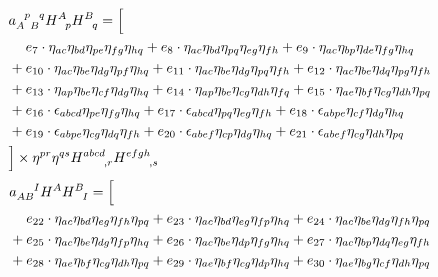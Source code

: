 \begin{itemize}
{\begin{minipage}[t]{\linewidth}
\begin{equation}
\begin{aligned}
    & a_{A\hphantom{p}B}^{\hphantom Ap\hphantom Bq} H^A_{\hphantom Ap} H^B_{\hphantom Bq} = \Big\lbrack \\
    & \hphantom{{}+{}} e_{7} \cdot \eta_{a c} \eta_{b d} \eta_{p e} \eta_{f g} \eta_{h q} + e_{8} \cdot \eta_{a c} \eta_{b d} \eta_{p q} \eta_{e g} \eta_{f h} + e_{9} \cdot \eta_{a c} \eta_{b p} \eta_{d e} \eta_{f g} \eta_{h q} \\
    & + e_{10} \cdot \eta_{a c} \eta_{b e} \eta_{d g} \eta_{p f} \eta_{h q} + e_{11} \cdot \eta_{a c} \eta_{b e} \eta_{d g} \eta_{p q} \eta_{f h} + e_{12} \cdot \eta_{a c} \eta_{b e} \eta_{d q} \eta_{p g} \eta_{f h} \\
    & + e_{13} \cdot \eta_{a p} \eta_{b e} \eta_{c f} \eta_{d g} \eta_{h q} + e_{14} \cdot \eta_{a p} \eta_{b e} \eta_{c g} \eta_{d h} \eta_{f q} + e_{15} \cdot \eta_{a e} \eta_{b f} \eta_{c g} \eta_{d h} \eta_{p q} \\
    & + e_{16} \cdot \epsilon_{a b c d} \eta_{p e} \eta_{f g} \eta_{h q} + e_{17} \cdot \epsilon_{a b c d} \eta_{p q} \eta_{e g} \eta_{f h} + e_{18} \cdot \epsilon_{a b p e} \eta_{c f} \eta_{d g} \eta_{h q} \\
    & + e_{19} \cdot \epsilon_{a b p e} \eta_{c g} \eta_{d q} \eta_{f h} + e_{20} \cdot \epsilon_{a b e f} \eta_{c p} \eta_{d g} \eta_{h q} + e_{21} \cdot \epsilon_{a b e f} \eta_{c g} \eta_{d h} \eta_{p q} \\
    & \Big\rbrack \times \eta^{pr} \eta^{qs} H^{abcd}_{\hphantom{abcd},r} H^{efgh}_{\hphantom{efgh},s}
  \end{aligned}
\end{equation}
\begin{equation}\label{ansatz_ABI}
  \begin{aligned}
    & a_{AB}^{\hphantom{AB}I} H^A H^B_{\hphantom BI} = \Big\lbrack \\
    & \hphantom{{}+{}} e_{22} \cdot \eta_{a c} \eta_{b d} \eta_{e g} \eta_{f h} \eta_{p q} + e_{23} \cdot \eta_{a c} \eta_{b d} \eta_{e g} \eta_{f p} \eta_{h q} + e_{24} \cdot \eta_{a c} \eta_{b e} \eta_{d g} \eta_{f h} \eta_{p q} \\
    & + e_{25} \cdot \eta_{a c} \eta_{b e} \eta_{d g} \eta_{f p} \eta_{h q} + e_{26} \cdot \eta_{a c} \eta_{b e} \eta_{d p} \eta_{f g} \eta_{h q} + e_{27} \cdot \eta_{a c} \eta_{b p} \eta_{d q} \eta_{e g} \eta_{f h} \\
    & + e_{28} \cdot \eta_{a e} \eta_{b f} \eta_{c g} \eta_{d h} \eta_{p q} + e_{29} \cdot \eta_{a e} \eta_{b f} \eta_{c g} \eta_{d p} \eta_{h q} + e_{30} \cdot \eta_{a e} \eta_{b g} \eta_{c f} \eta_{d h} \eta_{p q} \\

\end{aligned}
\end{equation}
\end{minipage}}
\end{itemize}
